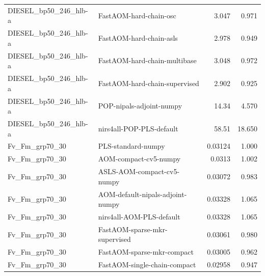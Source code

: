 \begin{landscape}
\begin{longtable}{L{8.0cm}L{9.5cm}rr}
DIESEL\_\allowbreak{}bp50\_\allowbreak{}246\_\allowbreak{}hlb-\allowbreak{}a & FastAOM-\allowbreak{}hard-\allowbreak{}chain-\allowbreak{}osc & 3.047 & 0.971 \\
DIESEL\_\allowbreak{}bp50\_\allowbreak{}246\_\allowbreak{}hlb-\allowbreak{}a & FastAOM-\allowbreak{}hard-\allowbreak{}chain-\allowbreak{}asls & 2.978 & 0.949 \\
DIESEL\_\allowbreak{}bp50\_\allowbreak{}246\_\allowbreak{}hlb-\allowbreak{}a & FastAOM-\allowbreak{}hard-\allowbreak{}chain-\allowbreak{}multibase & 3.048 & 0.972 \\
DIESEL\_\allowbreak{}bp50\_\allowbreak{}246\_\allowbreak{}hlb-\allowbreak{}a & FastAOM-\allowbreak{}hard-\allowbreak{}chain-\allowbreak{}supervised & 2.902 & 0.925 \\
DIESEL\_\allowbreak{}bp50\_\allowbreak{}246\_\allowbreak{}hlb-\allowbreak{}a & POP-\allowbreak{}nipals-\allowbreak{}adjoint-\allowbreak{}numpy & 14.34 & 4.570 \\
DIESEL\_\allowbreak{}bp50\_\allowbreak{}246\_\allowbreak{}hlb-\allowbreak{}a & nirs4all-\allowbreak{}POP-\allowbreak{}PLS-\allowbreak{}default & 58.51 & 18.650 \\
Fv\_\allowbreak{}Fm\_\allowbreak{}grp70\_\allowbreak{}30 & PLS-\allowbreak{}standard-\allowbreak{}numpy & 0.03124 & 1.000 \\
Fv\_\allowbreak{}Fm\_\allowbreak{}grp70\_\allowbreak{}30 & AOM-\allowbreak{}compact-\allowbreak{}cv5-\allowbreak{}numpy & 0.0313 & 1.002 \\
Fv\_\allowbreak{}Fm\_\allowbreak{}grp70\_\allowbreak{}30 & ASLS-\allowbreak{}AOM-\allowbreak{}compact-\allowbreak{}cv5-\allowbreak{}numpy & 0.03072 & 0.983 \\
Fv\_\allowbreak{}Fm\_\allowbreak{}grp70\_\allowbreak{}30 & AOM-\allowbreak{}default-\allowbreak{}nipals-\allowbreak{}adjoint-\allowbreak{}numpy & 0.03328 & 1.065 \\
Fv\_\allowbreak{}Fm\_\allowbreak{}grp70\_\allowbreak{}30 & nirs4all-\allowbreak{}AOM-\allowbreak{}PLS-\allowbreak{}default & 0.03328 & 1.065 \\
Fv\_\allowbreak{}Fm\_\allowbreak{}grp70\_\allowbreak{}30 & FastAOM-\allowbreak{}sparse-\allowbreak{}mkr-\allowbreak{}supervised & 0.03061 & 0.980 \\
Fv\_\allowbreak{}Fm\_\allowbreak{}grp70\_\allowbreak{}30 & FastAOM-\allowbreak{}sparse-\allowbreak{}mkr-\allowbreak{}compact & 0.03005 & 0.962 \\
Fv\_\allowbreak{}Fm\_\allowbreak{}grp70\_\allowbreak{}30 & FastAOM-\allowbreak{}single-\allowbreak{}chain-\allowbreak{}compact & 0.02958 & 0.947 \\

\end{longtable}
\end{landscape}
